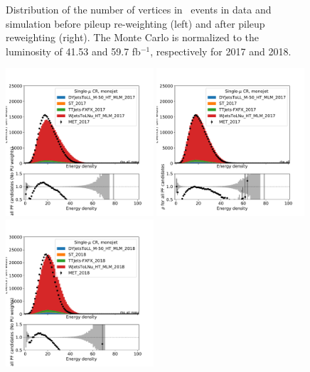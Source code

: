 \begin{figure}[ht!]
\begin{center}
    \caption{
        Distribution of the number of vertices in \Wmn~events in data and
        simulation before pileup re-weighting (left) and after pileup reweighting (right).
        The Monte Carlo is normalized to the luminosity of 41.53 and 59.7 fb$^{-1}$, respectively for 2017 and 2018.
    }
    \label{fig:purwt_npv}
  \end{center}
\end{figure}
\begin{figure}[ht!]
  \begin{center}
    \includegraphics[width=0.49\textwidth]{fig/pileup/cr_1m_j_rho_all_nopu_2017.pdf}
    \includegraphics[width=0.49\textwidth]{fig/pileup/cr_1m_j_rho_all_2017.pdf}
    \includegraphics[width=0.49\textwidth]{fig/pileup/cr_1m_j_rho_all_nopu_2018.pdf}

\end{center}
\end{figure}
